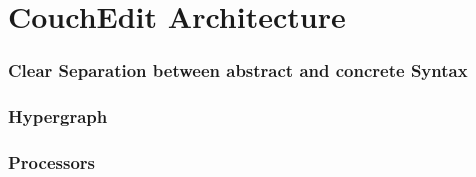 \section{CouchEdit Architecture}

\begin{frame}
  \frametitle{Clear Separation between abstract and concrete Syntax}
\end{frame}


\begin{frame}
  \frametitle{Hypergraph}
\end{frame}

\begin{frame}
  \frametitle{Processors}
\end{frame}